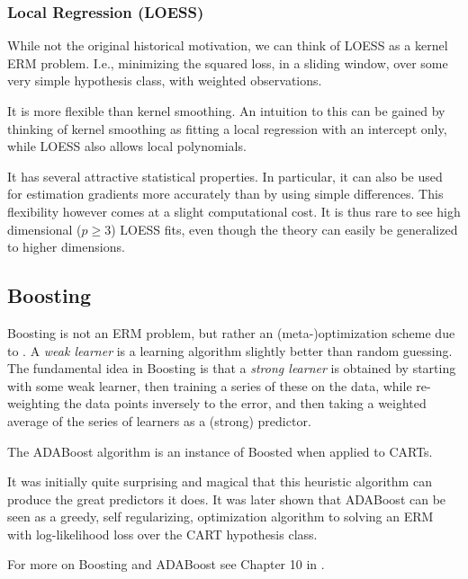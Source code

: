 \subsubsection{Local Regression (LOESS)}
\label{sec:loess}

While not the original historical motivation, we can think of LOESS as a kernel ERM problem. 
I.e., minimizing the squared loss, in a sliding window, over some very simple hypothesis class, with weighted observations.

It is more flexible than kernel smoothing.
An intuition to this can be gained by thinking of kernel smoothing as fitting a local regression with an intercept only, while LOESS also allows local polynomials.

It has several attractive statistical properties. In particular, it can also be used for estimation gradients more accurately than by using simple differences. 
This flexibility however comes at a slight computational cost. 
It is thus rare to see high dimensional ($p \geq 3$) LOESS fits, even though the theory can easily be generalized to higher dimensions.




\subsection{Boosting}
\label{sec:boosting}

Boosting is not an ERM problem, but rather an (meta-)optimization scheme due to \cite{schapire_strength_1990}.
A \emph{weak learner} is a learning algorithm slightly better than random guessing. 
The fundamental idea in Boosting is that a \emph{strong learner} is obtained by starting with some weak learner, then training a series of these on the data, while re-weighting the data points inversely to the error, and then taking a weighted average of the series of learners as a (strong) predictor.

The ADABoost algorithm \citep{freund_decision-theoretic_1997} is an instance of Boosted when applied to CARTs.

It was initially quite surprising and magical that this heuristic algorithm can produce the great predictors it does. 
It was later shown that ADABoost can be seen as a greedy, self regularizing, optimization algorithm to solving an ERM with log-likelihood loss \citep{friedman_additive_2000} over the CART hypothesis class.

For more on Boosting and ADABoost see Chapter 10 in \cite{hastie_elements_2003}.




